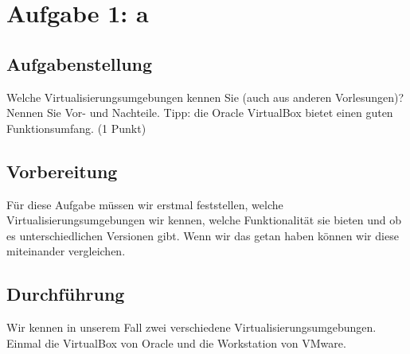 \newpage
\section{Aufgabe 1: a}

\subsection{Aufgabenstellung}
Welche Virtualisierungsumgebungen kennen Sie (auch aus anderen Vorlesungen)? Nennen
Sie Vor- und Nachteile. Tipp: die Oracle VirtualBox bietet einen guten Funktionsumfang.
(1 Punkt)

\subsection{Vorbereitung}
Für diese Aufgabe müssen wir erstmal feststellen, welche Virtualisierungsumgebungen wir kennen, welche Funktionalität sie bieten und ob es unterschiedlichen Versionen gibt. 
Wenn wir das getan haben können wir diese miteinander vergleichen.

\subsection{Durchführung}
Wir kennen in unserem Fall zwei verschiedene Virtualisierungsumgebungen. Einmal die VirtualBox von Oracle und die Workstation von VMware.

